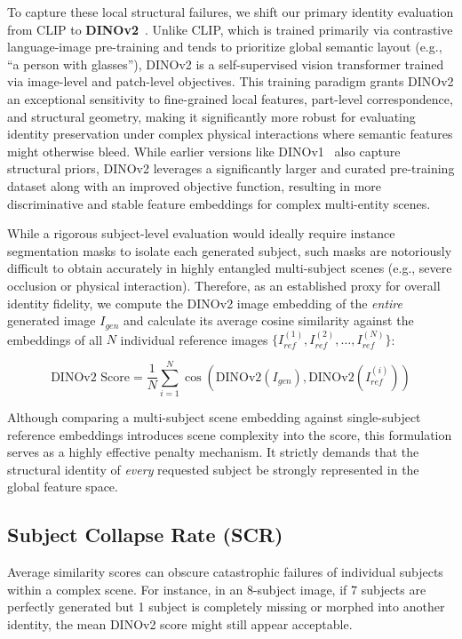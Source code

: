 To capture these local structural failures, we shift our primary identity evaluation from CLIP to \textbf{DINOv2}~\cite{oquab2023dinov2}. Unlike CLIP, which is trained primarily via contrastive language-image pre-training and tends to prioritize global semantic layout (e.g., ``a person with glasses''), DINOv2 is a self-supervised vision transformer trained via image-level and patch-level objectives. This training paradigm grants DINOv2 an exceptional sensitivity to fine-grained local features, part-level correspondence, and structural geometry, making it significantly more robust for evaluating identity preservation under complex physical interactions where semantic features might otherwise bleed. While earlier versions like DINOv1~\cite{caron2021emerging} also capture structural priors, DINOv2 leverages a significantly larger and curated pre-training dataset along with an improved objective function, resulting in more discriminative and stable feature embeddings for complex multi-entity scenes.

While a rigorous subject-level evaluation would ideally require instance segmentation masks to isolate each generated subject, such masks are notoriously difficult to obtain accurately in highly entangled multi-subject scenes (e.g., severe occlusion or physical interaction). Therefore, as an established proxy for overall identity fidelity, we compute the DINOv2 image embedding of the \textit{entire} generated image $I_{gen}$ and calculate its average cosine similarity against the embeddings of all $N$ individual reference images $\{I_{ref}^{(1)}, I_{ref}^{(2)}, \dots, I_{ref}^{(N)}\}$:

\begin{equation}
\text{DINOv2 Score} = \frac{1}{N} \sum_{i=1}^{N} \cos(\text{DINOv2}(I_{gen}), \text{DINOv2}(I_{ref}^{(i)}))
\end{equation}

Although comparing a multi-subject scene embedding against single-subject reference embeddings introduces scene complexity into the score, this formulation serves as a highly effective penalty mechanism. It strictly demands that the structural identity of \textit{every} requested subject be strongly represented in the global feature space.

\subsection{Subject Collapse Rate (SCR)}
Average similarity scores can obscure catastrophic failures of individual subjects within a complex scene. For instance, in an 8-subject image, if 7 subjects are perfectly generated but 1 subject is completely missing or morphed into another identity, the mean DINOv2 score might still appear acceptable. 

